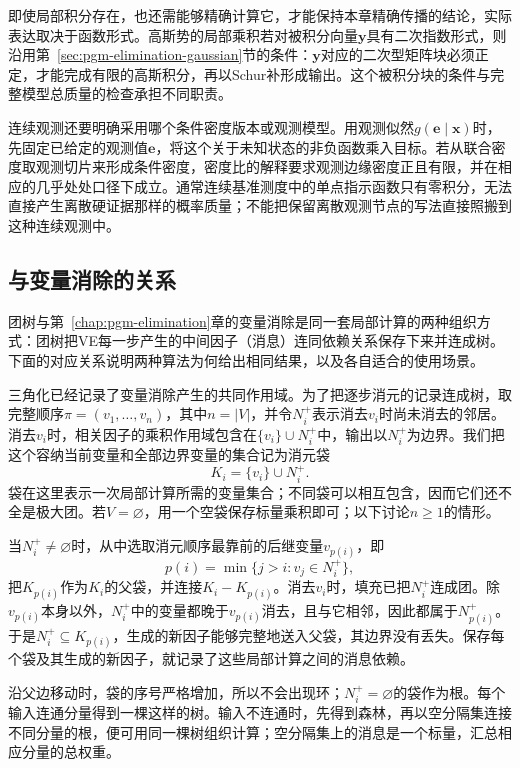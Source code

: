即使局部积分存在，也还需能够精确计算它，才能保持本章精确传播的结论，实际表达取决于函数形式。高斯势的局部乘积若对被积分向量$\bm y$具有二次指数形式，则沿用第~\ref{sec:pgm-elimination-gaussian}节的条件：$\bm y$对应的二次型矩阵块必须正定，才能完成有限的高斯积分，再以Schur补形成输出。这个被积分块的条件与完整模型总质量的检查承担不同职责。

连续观测还要明确采用哪个条件密度版本或观测模型。用观测似然$g(\bm e\mid\bm{x})$时，先固定已给定的观测值$\bm e$，将这个关于未知状态的非负函数乘入目标。若从联合密度取观测切片来形成条件密度，密度比的解释要求观测边缘密度正且有限，并在相应的几乎处处口径下成立。通常连续基准测度中的单点指示函数只有零积分，无法直接产生离散硬证据那样的概率质量；不能把保留离散观测节点的写法直接照搬到这种连续观测中。

\subsection{与变量消除的关系}
\label{sec:pgm-junction-tree-ve-relation}

团树与第~\ref{chap:pgm-elimination}章的变量消除是同一套局部计算的两种组织方式：团树把VE每一步产生的中间因子（消息）连同依赖关系保存下来并连成树。下面的对应关系说明两种算法为何给出相同结果，以及各自适合的使用场景。

三角化已经记录了变量消除产生的共同作用域。为了把逐步消元的记录连成树，取完整顺序$\pi=(v_1,\ldots,v_n)$，其中$n=|V|$，并令$N_i^+$表示消去$v_i$时尚未消去的邻居。消去$v_i$时，相关因子的乘积作用域包含在$\{v_i\}\cup N_i^+$中，输出以$N_i^+$为边界。我们把这个容纳当前变量和全部边界变量的集合记为消元袋
\begin{equation}
  K_i=\{v_i\}\cup N_i^+.
  \label{eq:pgm-junction-tree-elimination-bag}
\end{equation}
袋在这里表示一次局部计算所需的变量集合；不同袋可以相互包含，因而它们还不全是极大团。若$V=\varnothing$，用一个空袋保存标量乘积即可；以下讨论$n\ge1$的情形。

当$N_i^+\neq\varnothing$时，从中选取消元顺序最靠前的后继变量$v_{p(i)}$，即
\[
  p(i)=\min\{j>i:v_j\in N_i^+\},
\]
把$K_{p(i)}$作为$K_i$的父袋，并连接$K_i-K_{p(i)}$。消去$v_i$时，填充已把$N_i^+$连成团。除$v_{p(i)}$本身以外，$N_i^+$中的变量都晚于$v_{p(i)}$消去，且与它相邻，因此都属于$N_{p(i)}^+$。于是$N_i^+\subseteq K_{p(i)}$，生成的新因子能够完整地送入父袋，其边界没有丢失。保存每个袋及其生成的新因子，就记录了这些局部计算之间的消息依赖。

沿父边移动时，袋的序号严格增加，所以不会出现环；$N_i^+=\varnothing$的袋作为根。每个输入连通分量得到一棵这样的树。输入不连通时，先得到森林，再以空分隔集连接不同分量的根，便可用同一棵树组织计算；空分隔集上的消息是一个标量，汇总相应分量的总权重。

